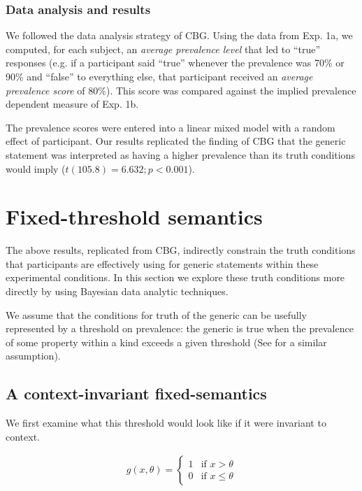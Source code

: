 \documentclass[10pt,letterpaper]{article}
\begin{document}
\subsubsection{Data analysis and results}

%
We followed the data analysis strategy of CBG. Using the data from Exp. 1a, we computed, for each subject, an \emph{average prevalence level} that led to ``true'' responses (e.g. if a participant said ``true'' whenever the prevalence was 70\% or 90\% and ``false'' to everything else, that participant received an \emph{average prevalence score} of 80\%). This score was compared against the implied prevalence dependent measure of Exp. 1b. 

The prevalence scores were entered into a linear mixed model with a random effect of participant. Our results replicated the finding of CBG that the generic statement was interpreted as having a higher prevalence than its truth conditions would imply ($t(105.8) = 6.632; p < 0.001$). 

\section{Fixed-threshold semantics}
The above results, replicated from CBG, indirectly constrain the truth conditions that participants are effectively using for generic statements within these experimental conditions. In this section we explore these truth conditions more directly by using Bayesian data analytic techniques.

We assume that the conditions for truth of the generic can be usefully represented by a threshold on prevalence: the generic is true when the prevalence of some property within a kind exceeds a given threshold (See  for a similar assumption).


\subsection{A context-invariant fixed-semantics}
We first examine what this threshold would look like if it were invariant to context. 

\begin{align}
 g(x, \theta) = \begin{cases}
   1 & \text{if } x > \theta \\
   0       & \text{if } x \leq \theta
  \end{cases}
   \label{eq:ftsem}
\end{align}
\end{document}
